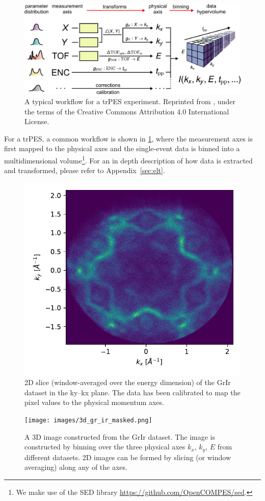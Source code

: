 \begin{figure}[h]
    \centering
    \includegraphics[width=1\linewidth]{images/41597_2020_769_Fig2_HTML.png}
    \caption{A typical workflow for a \gls{trPES} experiment. Reprinted from \cite{xianOpensourceEndtoendWorkflow2020}, under the terms of the Creative Commons Attribution 4.0 International License.}
    \label{fig:mpes_workflow}
\end{figure}

For a \gls{trPES}, a common workflow is shown in \cref{fig:mpes_workflow}, where the measurement axes is first mapped to the  physical axes and the single-event data is binned into a multidimensional volume\footnote{We make use of the \gls{SED} library \href{https://github.com/OpenCOMPES/sed}{https://github.com/OpenCOMPES/sed}.}. For an in depth description of how data is extracted and transformed, please refer to Appendix~\ref{sec:elt}.

\begin{figure}
    \centering
    \includegraphics[width=0.5\linewidth]{images/calibrated_momentum.pdf}
    \caption{2D slice (window-averaged over the energy dimension) of the \gls{GrIr} dataset in the \gls{ky}--\gls{kx} plane. The data has been calibrated to map the pixel values to the physical momentum axes.}
    \label{fig:grir-2d-slice-calibrated}
\end{figure}

\begin{figure}[h]
    \centering
    \texttt{[image: images/3d\_gr\_ir\_masked.png]}
    \caption{A 3D image constructed from the \gls{GrIr} dataset. The image is constructed by binning over the three physical axes $k_x$, $k_y$, $E$ from different datasets. 2D images can be formed by slicing (or window averaging) along any of the axes.}
    \label{fig:3d-gr-ir}
\end{figure}

